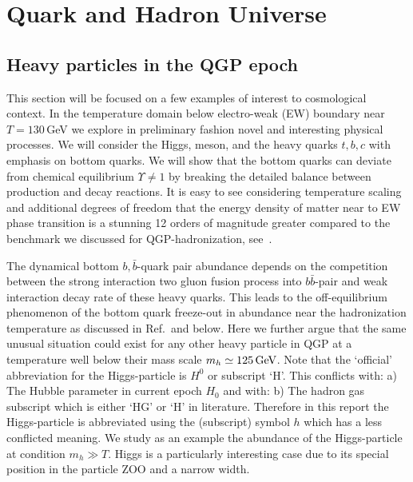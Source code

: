 \section{Quark and Hadron Universe}\label{part2}
\subsection{Heavy particles in the QGP epoch}
\label{HiggsQGP}
This section will be focused on a few examples of interest to cosmological context. In the temperature domain below electro-weak (EW) boundary near $T=130$\,GeV we explore in preliminary fashion novel and interesting physical processes. We will consider the Higgs, meson, and the heavy quarks $t,b,c$ with emphasis on bottom quarks. We will show that the bottom quarks can deviate from chemical equilibrium $\Upsilon\neq 1$ by breaking the detailed balance between production and decay reactions. It is easy to see considering temperature scaling and additional degrees of freedom that the energy density of matter near to EW phase transition is a stunning 12 orders of magnitude greater compared to the benchmark we discussed for QGP-hadronization, see~.
 
The dynamical bottom $ b,\bar b$-quark pair abundance depends on the competition between the strong interaction two gluon fusion process into $b\bar b$-pair and weak interaction decay rate of these heavy quarks. This leads to the off-equilibrium phenomenon of the bottom quark freeze-out in abundance near the hadronization temperature as discussed in Ref.\,\cite{Yang:2020nne} and below. Here we further argue that the same unusual situation could exist for any other heavy particle in QGP at a temperature well below their mass scale $m_h\simeq 125\text{\,GeV}$. {\color{black}Note that the `official' abbreviation for the Higgs-particle is $H^0$ or subscript `H'. This conflicts with: a) The Hubble parameter in current epoch $H_0$ and with: b) The hadron gas subscript which is either `HG' or `H' in literature. Therefore in this report the Higgs-particle is abbreviated using the (subscript) symbol $h$ which has a less conflicted meaning.} We study as an example the abundance of the Higgs-particle at condition $m_h\gg T$. Higgs is a particularly interesting case due to its special position in the particle ZOO and a narrow width.

